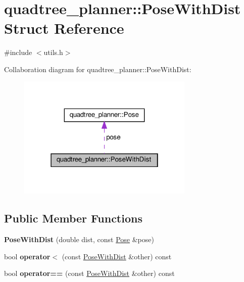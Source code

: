 \hypertarget{structquadtree__planner_1_1PoseWithDist}{}\section{quadtree\+\_\+planner\+:\+:Pose\+With\+Dist Struct Reference}
\label{structquadtree__planner_1_1PoseWithDist}


{\ttfamily \#include $<$utils.\+h$>$}



Collaboration diagram for quadtree\+\_\+planner\+:\+:Pose\+With\+Dist\+:\nopagebreak
\begin{figure}[H]
\begin{center}
\leavevmode
\includegraphics[width=238pt]{structquadtree__planner_1_1PoseWithDist__coll__graph}
\end{center}
\end{figure}
\subsection*{Public Member Functions}
\begin{DoxyCompactItemize}
\item 
\mbox{\label{structquadtree__planner_1_1PoseWithDist_a4f444de5a17f206cb78af02b5f6f27d4}} 
{\bfseries Pose\+With\+Dist} (double dist, const \hyperlink{structquadtree__planner_1_1Pose}{Pose} \&pose)
\item 
\mbox{\label{structquadtree__planner_1_1PoseWithDist_a293ef50a7f2e827f426b0d0d154db673}} 
bool {\bfseries operator$<$} (const \hyperlink{structquadtree__planner_1_1PoseWithDist}{Pose\+With\+Dist} \&other) const
\item 
\mbox{\label{structquadtree__planner_1_1PoseWithDist_a1a3636f214ea3c2b8985d119a7b895e5}} 
bool {\bfseries operator==} (const \hyperlink{structquadtree__planner_1_1PoseWithDist}{Pose\+With\+Dist} \&other) const
\end{DoxyCompactItemize}
